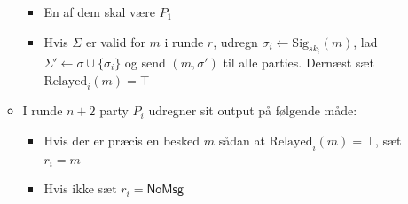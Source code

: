 \documentclass[a4, english]{article}
\begin{document}
\begin{itemize}
\begin{itemize}
\begin{itemize}
      \item En af dem skal være $P_1$
      \item Hvis $\Sigma$ er valid for $m$ i runde $r$, udregn $\sigma_i \leftarrow \text{Sig}_{sk_i}(m)$, lad $\Sigma' \leftarrow \sigma \cup \{\sigma_i\}$ og send $(m,\sigma')$ til alle parties. Dernæst sæt $\text{Relayed}_i(m)= \top$
    \end{itemize}
    \item I runde $n+2$ party $P_i$ udregner sit output på følgende måde:
    \begin{itemize}
    	\item Hvis der er præcis en besked $m$ sådan at $\text{Relayed}_i(m) = \top$, sæt $r_i = m$
      \item Hvis ikke sæt $r_i = \mathsf{NoMsg}$
    \end{itemize}

  \end{itemize}
\end{itemize}
\end{document}
